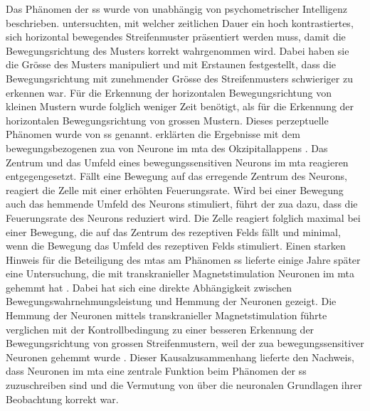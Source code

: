 \documentclass[11pt, twoside, a4paper]{book}		%
\begin{document}

Das Phänomen der \gls{ss} wurde von \citet{Tadin2003} unabhängig von psychometrischer Intelligenz beschrieben. \citeauthor{Tadin2003} untersuchten, mit welcher zeitlichen Dauer ein hoch kontrastiertes, sich horizontal bewegendes Streifenmuster präsentiert werden muss, damit die Bewegungsrichtung des Musters korrekt wahrgenommen wird. Dabei haben sie die Grösse des Musters manipuliert und mit Erstaunen festgestellt, dass die Bewegungsrichtung mit zunehmender Grösse des Streifenmusters schwieriger zu erkennen war. Für die Erkennung der horizontalen Bewegungsrichtung von kleinen Mustern wurde folglich weniger Zeit benötigt, als für die Erkennung der horizontalen Bewegungsrichtung von grossen Mustern. Dieses perzeptuelle Phänomen wurde von \citeauthor{Tadin2003} \gls{ss} genannt. %
\citeauthor{Tadin2003} erklärten die Ergebnisse mit dem bewegungsbezogenen \gls{zua} von Neurone im \gls{mta} des Okzipitallappens \citep{Allman1985a}. Das Zentrum und das Umfeld eines bewegungssensitiven Neurons im \gls{mta} reagieren entgegengesetzt. Fällt eine Bewegung auf das erregende Zentrum des Neurons, reagiert die Zelle mit einer erhöhten Feuerungsrate. Wird bei einer Bewegung auch das hemmende Umfeld des Neurons stimuliert, führt der \gls{zua} dazu, dass die Feuerungsrate des Neurons reduziert wird. Die Zelle reagiert folglich maximal bei einer Bewegung, die auf das Zentrum des rezeptiven Felds fällt und minimal, wenn die Bewegung das Umfeld des rezeptiven Felds stimuliert. Einen starken Hinweis für die Beteiligung des \gls{mta}s am Phänomen \gls{ss} lieferte einige Jahre später eine Untersuchung, die mit transkranieller Magnetstimulation Neuronen im \gls{mta} gehemmt hat \citep{Tadin2011}. 
Dabei hat sich eine direkte Abhängigkeit zwischen Bewegungswahrnehmungsleistung und Hemmung der Neuronen gezeigt. Die Hemmung der Neuronen mittels transkranieller Magnetstimulation führte verglichen mit der Kontrollbedingung zu einer besseren Erkennung der Bewegungsrichtung von grossen Streifenmustern,  weil der \gls{zua} bewegungssensitiver Neuronen gehemmt wurde \citep{Tadin2011}. Dieser Kausalzusammenhang lieferte den Nachweis, dass Neuronen im \gls{mta} eine zentrale Funktion beim Phänomen der \gls{ss} zuzuschreiben sind und die Vermutung von \citet{Tadin2003} über die neuronalen Grundlagen ihrer Beobachtung korrekt war. 
\end{document}
